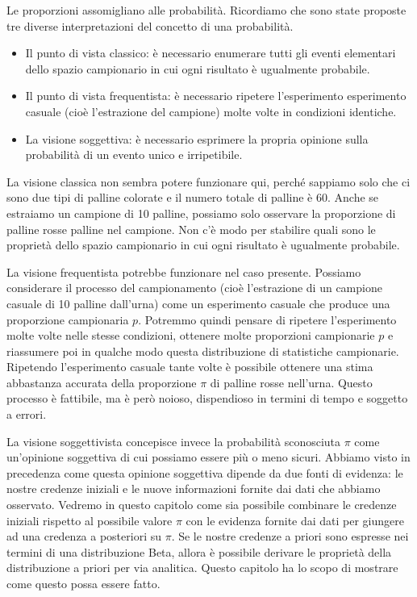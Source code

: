\documentclass[
  11pt,
]{krantz}
\providecommand{\tightlist}{%
  \setlength{\itemsep}{0pt}\setlength{\parskip}{0pt}}
\theoremstyle{definition}
\theoremstyle{definition}
\theoremstyle{definition}
\theoremstyle{definition}
\theoremstyle{remark}
\begin{document}
Le proporzioni assomigliano alle probabilità. Ricordiamo che sono state proposte tre diverse interpretazioni del concetto di una probabilità.

\begin{itemize}
\tightlist
\item
  Il punto di vista classico: è necessario enumerare tutti gli eventi elementari dello spazio campionario in cui ogni risultato è ugualmente probabile.
\item
  Il punto di vista frequentista: è necessario ripetere l'esperimento esperimento casuale (cioè l'estrazione del campione) molte volte in condizioni identiche.
\item
  La visione soggettiva: è necessario esprimere la propria opinione sulla probabilità di un evento unico e irripetibile.
\end{itemize}

La visione classica non sembra potere funzionare qui, perché sappiamo solo che ci sono due tipi di palline colorate e il numero totale di palline è 60. Anche se estraiamo un campione di 10 palline, possiamo solo osservare la proporzione di palline rosse palline nel campione. Non c'è modo per stabilire quali sono le proprietà dello spazio campionario in cui ogni risultato è ugualmente probabile.

La visione frequentista potrebbe funzionare nel caso presente. Possiamo considerare il processo del campionamento (cioè l'estrazione di un campione casuale di 10 palline dall'urna) come un esperimento casuale che produce una proporzione campionaria \(p\). Potremmo quindi pensare di ripetere l'esperimento molte volte nelle stesse condizioni, ottenere molte proporzioni campionarie \(p\) e riassumere poi in qualche modo questa distribuzione di statistiche campionarie. Ripetendo l'esperimento casuale tante volte è possibile ottenere una stima abbastanza accurata della proporzione \(\pi\) di palline rosse nell'urna. Questo processo è fattibile, ma è però noioso, dispendioso in termini di tempo e soggetto a errori.

La visione soggettivista concepisce invece la probabilità sconosciuta \(\pi\) come un'opinione soggettiva di cui possiamo essere più o meno sicuri. Abbiamo visto in precedenza come questa opinione soggettiva dipende da due fonti di evidenza: le nostre credenze iniziali e le nuove informazioni fornite dai dati che abbiamo osservato. Vedremo in questo capitolo come sia possibile combinare le credenze iniziali rispetto al possibile valore \(\pi\) con le evidenza fornite dai dati per giungere ad una credenza a posteriori su \(\pi\). Se le nostre credenze a priori sono espresse nei termini di una distribuzione Beta, allora è possibile derivare le proprietà della distribuzione a priori per via analitica. Questo capitolo ha lo scopo di mostrare come questo possa essere fatto.
\end{document}
